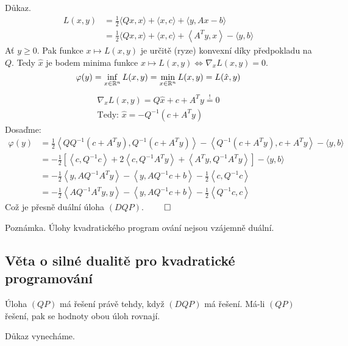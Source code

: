 Důkaz.
\begin{align*}
    L(x,y) &= \frac{1}{2}\langle Qx, x\rangle + \langle x, c\rangle + \langle y, Ax-b\rangle\\
    &= \frac{1}{2}\langle Qx, x\rangle + \langle x, c\rangle + \left\langle A^Ty, x\right\rangle - \langle y,b\rangle
\end{align*}
Ať $y \geq 0$. Pak funkce $x \mapsto L(x, y)$ je určitě (ryze) konvexní díky předpokladu na $Q$. Tedy $\hat x$ je bodem
minima funkce $x \mapsto L(x, y) \iff \nabla_x L(x, y) = 0$.
\[
    \varphi(y) = \inf_{x \in \mathbb{R}^n} L(x, y) = \min_{x \in \mathbb{R}^n} L(x, y) = L(\hat x, y)
\]
\begin{align*}
    \nabla_x L(x, y) = Q \hat x + c + A^Ty \overset{!}{=} 0 \\
    \text{Tedy: } \hat x = -Q^{-1}(c + A^Ty)
\end{align*}
Dosaďme:
\begin{align*}
    \varphi(y) &= \frac{1}{2}\left\langle QQ^{-1}(c + A^Ty), Q^{-1}(c + A^Ty)\right\rangle - 
    \left\langle Q^{-1}(c + A^Ty), c+A^Ty\right\rangle - \langle y,b\rangle \\
    &= -\frac{1}{2}\left[\left\langle c, Q^{-1}c\right\rangle + 2\left\langle c, Q^{-1}A^Ty\right\rangle
    + \left\langle A^Ty, Q^{-1}A^Ty\right\rangle\right] - \langle y, b\rangle \\
    &= -\frac{1}{2}\left\langle y, AQ^{-1}A^Ty\right\rangle - \left\langle y, AQ^{-1}c+b\right\rangle
    -\frac{1}{2}\left\langle c, Q^{-1}c\right\rangle \\
    &= -\frac{1}{2}\left\langle AQ^{-1}A^Ty, y\right\rangle - \left\langle y, AQ^{-1}c+b\right\rangle
    -\frac{1}{2}\left\langle Q^{-1}c, c\right\rangle
\end{align*}
Což je přesně duální úloha $(DQP)$. $\qed$

Poznámka. Úlohy kvadratického program
ování nejsou vzájemně duální.

\subsection{Věta o silné dualitě pro kvadratické programování}
Úloha $(QP)$ má řešení právě tehdy, když $(DQP)$ má řešení. Má-li $(QP)$ řešení, pak se hodnoty obou úloh rovnají.

Důkaz vynecháme.